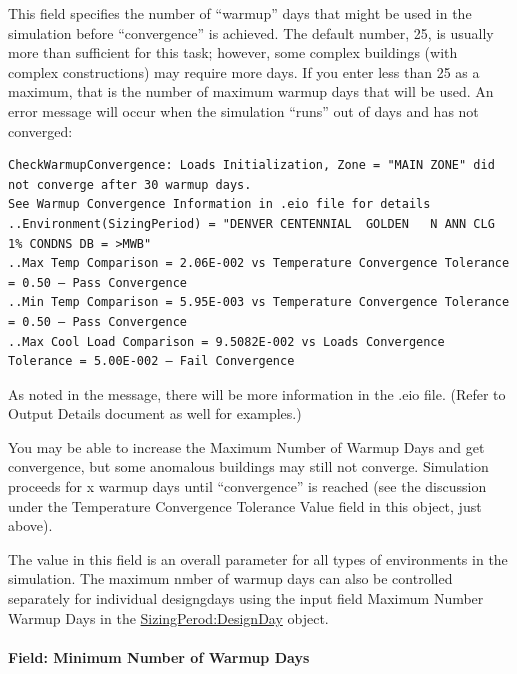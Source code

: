 This field specifies the number of ``warmup'' days that might be used in the simulation before ``convergence'' is achieved. The default number, 25, is usually more than sufficient for this task; however, some complex buildings (with complex constructions) may require more days. If you enter less than 25 as a maximum, that is the number of maximum warmup days that will be used. An error message will occur when the simulation ``runs'' out of days and has not converged:

\begin{lstlisting}
CheckWarmupConvergence: Loads Initialization, Zone = "MAIN ZONE" did not converge after 30 warmup days.
See Warmup Convergence Information in .eio file for details
..Environment(SizingPeriod) = "DENVER CENTENNIAL  GOLDEN   N ANN CLG 1% CONDNS DB = >MWB"
..Max Temp Comparison = 2.06E-002 vs Temperature Convergence Tolerance = 0.50 – Pass Convergence
..Min Temp Comparison = 5.95E-003 vs Temperature Convergence Tolerance = 0.50 – Pass Convergence
..Max Cool Load Comparison = 9.5082E-002 vs Loads Convergence Tolerance = 5.00E-002 – Fail Convergence
\end{lstlisting}

As noted in the message, there will be more information in the .eio file. (Refer to Output Details document as well for examples.)

You may be able to increase the Maximum Number of Warmup Days and get convergence, but some anomalous buildings may still not converge. Simulation proceeds for x warmup days until ``convergence'' is reached (see the discussion under the Temperature Convergence Tolerance Value field in this object, just above).

The value in this field is an overall parameter for all types of environments in the simulation.  The maximum nmber of warmup days can also be controlled separately for individual designgdays using the input field Maximum Number Warmup Days in the \hyperref[sizingperioddesignday]{SizingPerod:DesignDay} object.

\paragraph{Field: Minimum Number of Warmup Days}\label{field-minimum-number-of-warmup-days}

